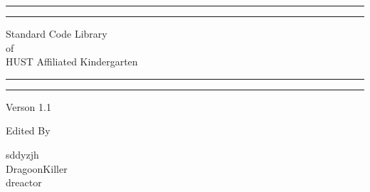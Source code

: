 \documentclass[a4paper]{article}
\begin{document}
\begin{titlepage} %

	\centering %
	
	\scshape %
	
	\vspace*{\baselineskip} %
	
	
	\rule{\textwidth}{1.6pt}\vspace*{-\baselineskip}\vspace*{2pt} %
	\rule{\textwidth}{0.4pt} %
	
	\vspace{0.75\baselineskip} %
	
	{\LARGE Standard Code Library\\ of\\ HUST Affiliated Kindergarten\\} %
	
	\vspace{0.75\baselineskip} %
	
	\rule{\textwidth}{0.4pt}\vspace*{-\baselineskip}\vspace{3.2pt} %
	\rule{\textwidth}{1.6pt} %
	
	\vspace{2\baselineskip} %
	
	
	Verson 1.1 %
	
	\vspace*{3\baselineskip} %
	
	
	Edited By
	
	\vspace{0.5\baselineskip} %
	
	{\protect sddyzjh \\ DragoonKiller \\ dreactor \\} %
	

\end{titlepage}
\end{document}
